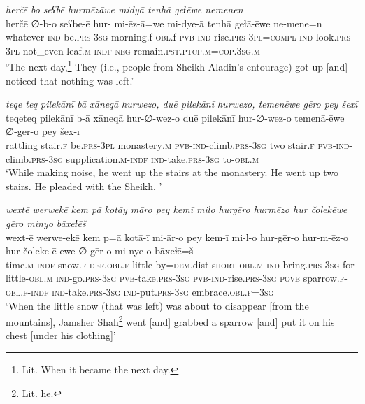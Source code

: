 \ea \label{PM.24}
\textit{herčē bo seʕbē hurmēzāwe miđyā tenhā geɫēwe nemenen} \\ 
\gll herčē ∅-b-o seʕbe-ē hur- mi-ēz-ā=we mi-đye-ā tenhā geɫā-ēwe ne-mene=n \\ 
 whatever \textsc{ind-}be\textsc{.prs}\textsc{-3sg} morning.f\textsc{-obl}.f \textsc{pvb-}\textsc{ind-}rise\textsc{.prs}\textsc{-3pl}\textsc{=compl} \textsc{ind-}look\textsc{.prs}\textsc{-3pl} not\_even leaf\textsc{.m}\textsc{-indf} \textsc{neg-}remain\textsc{.pst}\textsc{.ptcp}\textsc{.m}\textsc{=cop}\textsc{.3sg}\textsc{.m} \\ 
\glt `The next day,\footnote{Lit. When it became the next day.} They (i.e., people from Sheikh Aladin’s entourage) got up [and] noticed that nothing was left.'
\z 
 
\ea \label{DG.62}
\textit{teqe teq pilekānī bā xāneqā hurwezo, duē pilekānī hurwezo, temenēwe gēro pey šexī} \\ 
\gll teqeteq pilekānī b-ā xāneqā hur-∅-wez-o duē pilekānī hur-∅-wez-o temenā-ēwe ∅-gēr-o pey šex-ī \\ 
 rattling stair\textsc{\textsc{.f}} be\textsc{.prs}\textsc{-3pl} monastery\textsc{.m} \textsc{pvb-}\textsc{ind-}climb\textsc{.prs}\textsc{-3sg} two stair\textsc{\textsc{.f}} \textsc{pvb-}\textsc{ind-}climb\textsc{.prs}\textsc{-3sg} supplication\textsc{.m}\textsc{-indf} \textsc{ind-}take\textsc{.prs}\textsc{-3sg} to\textsc{-obl}\textsc{.m} \\ 
\glt `While making noise, he went up the stairs at the monastery. He went up two stairs. He pleaded with the Sheikh. '
\z 
 
\ea \label{DP.36}
\textit{wextē werwekē kem pā kotāy māro pey kemī milo hurgēro hurmēzo hur čolekēwe gēro minyo bāxeɫēš} \\ 
\gll wext-ē werwe-ekē kem p=ā kotā-ī mi-ār-o pey kem-ī mi-l-o hur-gēr-o hur-m-ēz-o hur čoleke-ē-ewe ∅-gēr-o mi-nye-o bāxeɫē=š \\ 
 time\textsc{.m}\textsc{-indf} snow\textsc{\textsc{.f}}\textsc{-def}\textsc{.obl}\textsc{\textsc{.f}} little by\textsc{=dem}.dist s\textsc{hort}\textsc{-obl}\textsc{.m} \textsc{ind-}bring\textsc{.prs}\textsc{-3sg} for little\textsc{-obl}\textsc{.m} \textsc{ind-}go\textsc{.prs}\textsc{-3sg} \textsc{pvb-}take\textsc{.prs}\textsc{-3sg} \textsc{pvb-}\textsc{ind-}rise\textsc{.prs}\textsc{-3sg} \textsc{povb} sparrow\textsc{\textsc{.f}}\textsc{-obl}\textsc{\textsc{.f}}\textsc{-indf} \textsc{ind-}take\textsc{.prs}\textsc{-3sg} \textsc{ind-}put\textsc{.prs}\textsc{-3sg} embrace\textsc{.obl}\textsc{\textsc{.f}}\textsc{=3sg} \\ 
\glt `When the little snow (that was left) was about to disappear [from the mountains], Jamsher Shah\footnote{Lit. he.} went [and] grabbed a sparrow [and] put it on his chest [under his clothing]'
\z 
 

